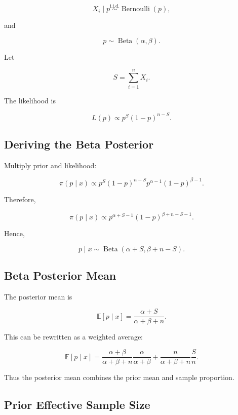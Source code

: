 \[
X_i\mid p
\overset{\text{i.i.d.}}{\sim}
\operatorname{Bernoulli}(p),
\]

and

\[
p
\sim
\operatorname{Beta}(\alpha,\beta).
\]

Let

\[
S
=
\sum_{i=1}^{n}X_i.
\]

The likelihood is

\[
\boxed{
L(p)
\propto
p^S
(1-p)^{n-S}.
}
\]

\subsection{Deriving the Beta Posterior}
\label{subsec:derive-beta-posterior}

Multiply prior and likelihood:

\[
\pi(p\mid x)
\propto
p^S
(1-p)^{n-S}
p^{\alpha-1}
(1-p)^{\beta-1}.
\]

Therefore,

\[
\pi(p\mid x)
\propto
p^{\alpha+S-1}
(1-p)^{\beta+n-S-1}.
\]

Hence,

\[
\boxed{
p\mid x
\sim
\operatorname{Beta}
(
\alpha+S,
\beta+n-S
).
}
\]

\subsection{Beta Posterior Mean}
\label{subsec:beta-posterior-mean}

The posterior mean is

\[
\boxed{
\mathbb{E}[p\mid x]
=
\frac{
\alpha+S
}{
\alpha+\beta+n
}.
}
\]

This can be rewritten as a weighted average:

\[
\boxed{
\mathbb{E}[p\mid x]
=
\frac{
\alpha+\beta
}{
\alpha+\beta+n
}
\frac{\alpha}{\alpha+\beta}
+
\frac{
n
}{
\alpha+\beta+n
}
\frac{S}{n}.
}
\]

Thus the posterior mean combines the prior mean and sample proportion.

\subsection{Prior Effective Sample Size}
\label{subsec:beta-effective-sample-size}

